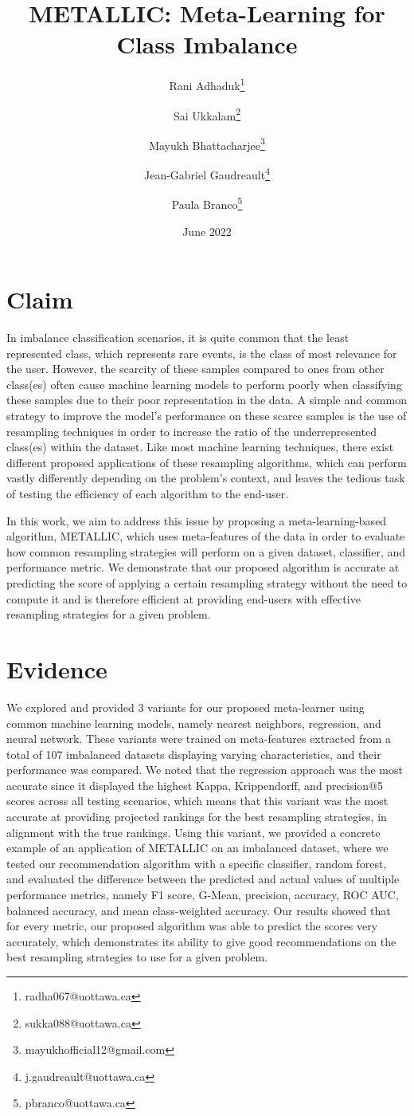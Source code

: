 \documentclass[a4paper]{article}
\title{METALLIC: Meta-Learning for Class Imbalance}
\author[1]{Rani Adhaduk\thanks{radha067@uottawa.ca}}
\author[1]{Sai Ukkalam\thanks{sukka088@uottawa.ca}}
\author[2]{Mayukh Bhattacharjee\thanks{mayukhofficial12@gmail.com}}
\author[1]{Jean-Gabriel Gaudreault\thanks{j.gaudreault@uottawa.ca}}
\author[1]{Paula Branco\thanks{pbranco@uottawa.ca}}
\affil[1]{School of Electrical Engineering and Computer Science\\
              University of Ottawa, Canada}
\affil[2]{University of Engineering and Management\\
              Kolkata, India}
\date{June 2022}
\begin{document}
\maketitle

\section{Claim}
In imbalance classification scenarios, it is quite common that the least represented class, which represents rare events, is the class of most relevance for the user. However, the scarcity of these samples compared to ones from other class(es) often cause machine learning models to perform poorly when classifying these samples due to their poor representation in the data. A simple and common strategy to improve the model's performance on these scarce samples is the use of resampling techniques in order to increase the ratio of the underrepresented class(es) within the dataset. Like most machine learning techniques, there exist different proposed applications of these resampling algorithms, which can perform vastly differently depending on the problem's context, and leaves the tedious task of testing the efficiency of each algorithm to the end-user. 

In this work, we aim to address this issue by proposing a meta-learning-based algorithm, METALLIC, which uses meta-features of the data in order to evaluate how common resampling strategies will perform on a given dataset, classifier, and performance metric. We demonstrate that our proposed algorithm is accurate at predicting the score of applying a certain resampling strategy without the need to compute it and is therefore efficient at providing end-users with effective resampling strategies for a given problem.

\section{Evidence}
We explored and provided 3 variants for our proposed meta-learner using common machine learning models, namely nearest neighbors, regression, and neural network. These variants were trained on meta-features extracted from a total of 107 imbalanced datasets displaying varying characteristics, and their performance was compared. We noted that the regression approach was the most accurate since it displayed the highest Kappa, Krippendorff, and precision@5 scores across all testing scenarios, which means that this variant was the most accurate at providing projected rankings for the best resampling strategies, in alignment with the true rankings. Using this variant, we provided a concrete example of an application of METALLIC on an imbalanced dataset, where we tested our recommendation algorithm with a specific classifier, random forest, and evaluated the difference between the predicted and actual values of multiple performance metrics, namely F1 score, G-Mean, precision, accuracy, ROC AUC, balanced accuracy, and mean class-weighted accuracy. Our results showed that for every metric, our proposed algorithm was able to predict the scores very accurately, which demonstrates its ability to give good recommendations on the best resampling strategies to use for a given problem.
\end{document}
